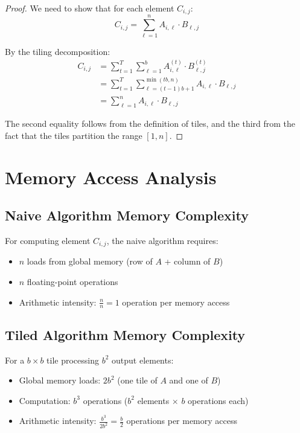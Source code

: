 \documentclass{amsbook}
\theoremstyle{definition}
\begin{document}
\begin{proof}
We need to show that for each element $C_{i,j}$:
\begin{equation}
C_{i,j} = \sum_{\ell=1}^{n} A_{i,\ell} \cdot B_{\ell,j}
\end{equation}

By the tiling decomposition:
\begin{align}
C_{i,j} &= \sum_{t=1}^{T} \sum_{\ell=1}^{b} A^{(t)}_{i,\ell} \cdot B^{(t)}_{\ell,j} \\
&= \sum_{t=1}^{T} \sum_{\ell=(t-1)b+1}^{\min(tb,n)} A_{i,\ell} \cdot B_{\ell,j} \\
&= \sum_{\ell=1}^{n} A_{i,\ell} \cdot B_{\ell,j}
\end{align}

The second equality follows from the definition of tiles, and the third from the fact that the tiles partition the range $[1,n]$.
\end{proof}

\section{Memory Access Analysis}

\subsection{Naive Algorithm Memory Complexity}

For computing element $C_{i,j}$, the naive algorithm requires:
\begin{itemize}
\item $n$ loads from global memory (row of $A$ + column of $B$)
\item $n$ floating-point operations
\item Arithmetic intensity: $\frac{n}{n} = 1$ operation per memory access
\end{itemize}

\subsection{Tiled Algorithm Memory Complexity}

For a $b \times b$ tile processing $b^2$ output elements:
\begin{itemize}
\item Global memory loads: $2b^2$ (one tile of $A$ and one of $B$)
\item Computation: $b^3$ operations ($b^2$ elements $\times$ $b$ operations each)
\item Arithmetic intensity: $\frac{b^3}{2b^2} = \frac{b}{2}$ operations per memory access
\end{itemize}
\end{document}
